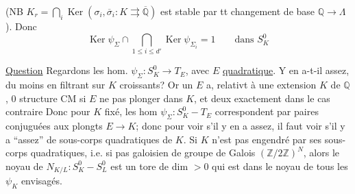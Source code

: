 (NB $K_r=\bigcap_i\operatorname{Ker}(\sigma_i,\overline\sigma_i:
K\rightrightarrows\overline{\mathbb Q})$ est stable par tt changement de base
$\mathbb Q\longrightarrow\Lambda$). Donc
\[
\operatorname{Ker}\psi_\Sigma\cap\bigcap_{1\leq i\leq d'}\operatorname{Ker}\psi_{\Sigma_i}
=1\qquad\text{dans }S_K^0
\]

\uline{Question} Regardons les hom. $\psi_\Sigma:S_K^0\longrightarrow T_E$, avec $E$
\uline{quadratique}. Y en a-t-il assez, du moins en filtrant sur $K$ croissants?
Or un $E$ a, relativt à une  extension $K$ de $\mathbb Q$,
 $0$ structure CM si $E$ ne pas plonger dans $K$, et deux exactement
dans le cas contraire 
\inserted{[L'hom $\psi_K$ correspondant est \deleted{\operatorname{Tr}_{K/E}} $N_{K/E}$.}
Donc pour $K$ fixé, les hom $\psi_\Sigma:S_K^0-T_E$ correspondent par paires conjuguées
aux plongts $E\longrightarrow K$; donc pour voir s'il y en a assez, il faut voir s'il y a
``assez'' de sous-corps quadratiques de $K$.
Si $K$  n'est pas 
engendré par ses sous-corps quadratiques, i.e. si  
pas galoisien de groupe de Galois $(\mathbb Z/2\mathbb Z)^N$, alors le noyau de
$N_{K/L}:S_K^0-S_L^0$ est un tore de dim $>0$ qui est dans le noyau de tous les
$\psi_K$ envisagés.
